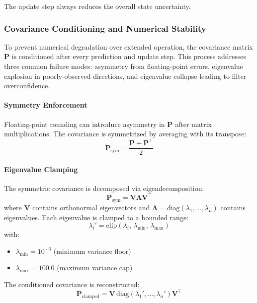 \documentclass[11pt]{article}
\begin{document}
The update step always reduces the overall state uncertainty.

\subsubsection{Covariance Conditioning and Numerical Stability}

To prevent numerical degradation over extended operation, the covariance matrix $\mathbf{P}$ is conditioned after every prediction and update step. This process addresses three common failure modes: asymmetry from floating-point errors, eigenvalue explosion in poorly-observed directions, and eigenvalue collapse leading to filter overconfidence.

\paragraph{Symmetry Enforcement}
Floating-point rounding can introduce asymmetry in $\mathbf{P}$ after matrix multiplications. The covariance is symmetrized by averaging with its transpose:
\begin{equation}
	\mathbf{P}_{\text{sym}} = \frac{\mathbf{P} + \mathbf{P}^\top}{2}
\end{equation}

\paragraph{Eigenvalue Clamping}
The symmetric covariance is decomposed via eigendecomposition:
\begin{equation}
	\mathbf{P}_{\text{sym}} = \mathbf{V} \boldsymbol{\Lambda} \mathbf{V}^\top
\end{equation}
where $\mathbf{V}$ contains orthonormal eigenvectors and $\boldsymbol{\Lambda} = \text{diag}(\lambda_1, \ldots, \lambda_n)$ contains eigenvalues. Each eigenvalue is clamped to a bounded range:
\begin{equation}
	\lambda_i' = \text{clip}(\lambda_i,\, \lambda_{\min},\, \lambda_{\max})
\end{equation}
with:
\begin{itemize}
	\item $\lambda_{\min} = 10^{-6}$ (minimum variance floor)
	\item $\lambda_{\max} = 100.0$ (maximum variance cap)
\end{itemize}

The conditioned covariance is reconstructed:
\begin{equation}
	\mathbf{P}_{\text{clamped}} = \mathbf{V} \,\text{diag}(\lambda_1', \ldots, \lambda_n') \mathbf{V}^\top
\end{equation}
\end{document}
